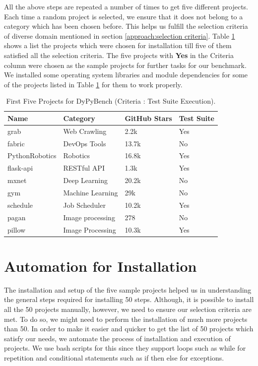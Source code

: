 All the above steps are repeated a number of times to get five different projects.
Each time a random project is selected, we ensure that it does not belong to a category which has been chosen before.
This helps us fulfill the selection criteria of diverse domain mentioned in section \ref{approach:selection criteria}.
Table \ref{table:first_5_projects} shows a list the projects which were chosen for installation till five of them satisfied all the selection criteria.
The five projects with \textbf{Yes} in the Criteria column were chosen as the sample projects for further tasks for our benchmark.
We installed some operating system libraries and module dependencies for some of the projects listed in Table \ref{table:first_5_projects} for them to work properly.  

\begin{table}[ht]
    \centering
    \begin{tabular}{llll}
    \hline
    \textbf{Name} & \textbf{Category} & \textbf{GitHub Stars} & \textbf{Test Suite}\\
    \hline
    grab & Web Crawling & 2.2k & Yes\\
    fabric & DevOps Tools & 13.7k & No\\
    PythonRobotics & Robotics & 16.8k & Yes\\
    flask-api & RESTful API & 1.3k & Yes\\
    mxnet & Deep Learning & 20.2k & No\\
    gym & Machine Learning & 29k & No\\
    schedule & Job Scheduler & 10.2k & Yes\\
    pagan & Image processing & 278 & No\\
    pillow & Image Processing & 10.3k & Yes\\
    \hline
    \end{tabular}
    \caption{First Five Projects for DyPyBench (Criteria : Test Suite Execution).}
    \label{table:first_5_projects}
\end{table}

\section{Automation for Installation}
\label{impl:Automation for Installation}
The installation and setup of the five sample projects helped us in understanding the general steps required for installing 50 steps.
Although, it is possible to install all the 50 projects manually, however, we need to ensure our selection criteria are met.
To do so, we might need to perform the installation of much more projects than 50.
In order to make it easier and quicker to get the list of 50 projects which satisfy our needs, we automate the process of installation and execution of projects.
We use bash scripts for this since they support loops such as while for repetition and conditional statements such as if then else for exceptions.

